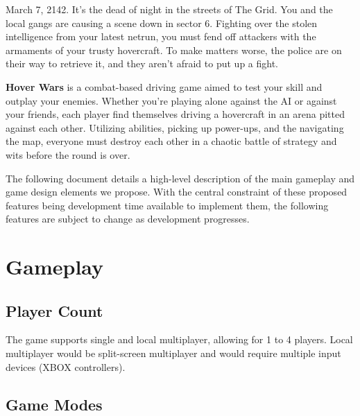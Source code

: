 \documentclass{article}
\newcommand{\namenobold}{Hover Wars}
\newcommand{\name}{\textbf{\namenobold}}
\theoremstyle{definition}
\begin{document}

March 7, 2142. It's the dead of night in the streets of The Grid. You and the
local gangs are causing a scene down in sector 6. Fighting over the stolen
intelligence from your latest netrun, you must fend off attackers with the
armaments of your trusty hovercraft. To make matters worse, the police are on
their way to retrieve it, and they aren't afraid to put up a fight.

\name{} is a combat-based driving game aimed to test your skill and outplay
your enemies. Whether you're playing alone against the AI or against your
friends, each player find themselves driving a hovercraft in an arena pitted
against each other. Utilizing abilities, picking up power-ups, and the
navigating the map, everyone must destroy each other in a chaotic battle of
strategy and wits before the round is over.

The following document details a high-level description of the main gameplay
and game design elements we propose. With the central constraint of these
proposed features being development time available to implement them, the
following features are subject to change as development progresses.

\section{Gameplay}

\subsection{Player Count}

The game supports single and local multiplayer, allowing for 1 to 4 players.
Local multiplayer would be split-screen multiplayer and would require multiple
input devices (XBOX controllers).

\subsection{Game Modes}
\end{document}

